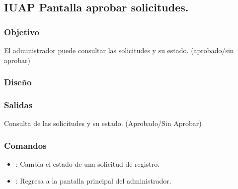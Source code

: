 
\subsection{IUAP Pantalla aprobar solicitudes.}

\subsubsection{Objetivo}
	El administrador puede consultar las solicitudes y su estado. (aprobado/sin aprobar)

\subsubsection{Diseño}


\subsubsection{Salidas}

	Consulta de las solicitudes y su estado. (Aprobado/Sin Aprobar)



\subsubsection{Comandos}
\begin{itemize}
	\item {}: Cambia el estado de una solicitud de registro.
\end{itemize}
\begin{itemize}
	\item {}: Regresa a la pantalla principal del administrador.
\end{itemize}

